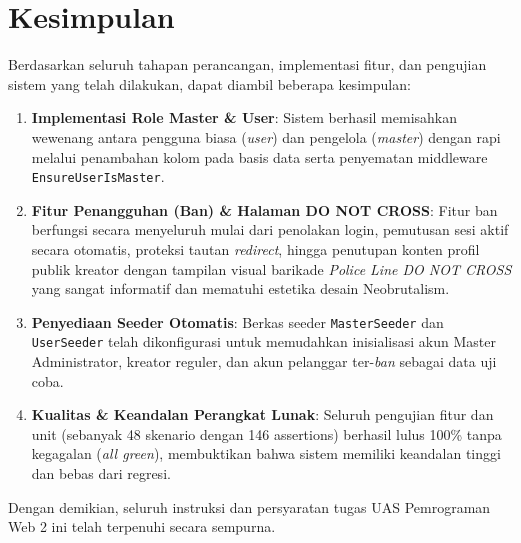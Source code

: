 \documentclass[12pt,a4paper]{article}
\begin{document}
\newpage

\section{Kesimpulan}

Berdasarkan seluruh tahapan perancangan, implementasi fitur, dan pengujian sistem yang telah dilakukan, dapat diambil beberapa kesimpulan:
\begin{enumerate}
    \item \textbf{Implementasi Role Master \& User}: Sistem berhasil memisahkan wewenang antara pengguna biasa (\textit{user}) dan pengelola (\textit{master}) dengan rapi melalui penambahan kolom pada basis data serta penyematan middleware \texttt{EnsureUserIsMaster}.
    \item \textbf{Fitur Penangguhan (Ban) \& Halaman DO NOT CROSS}: Fitur ban berfungsi secara menyeluruh mulai dari penolakan login, pemutusan sesi aktif secara otomatis, proteksi tautan \textit{redirect}, hingga penutupan konten profil publik kreator dengan tampilan visual barikade \textit{Police Line DO NOT CROSS} yang sangat informatif dan mematuhi estetika desain Neobrutalism.
    \item \textbf{Penyediaan Seeder Otomatis}: Berkas seeder \texttt{MasterSeeder} dan \texttt{UserSeeder} telah dikonfigurasi untuk memudahkan inisialisasi akun Master Administrator, kreator reguler, dan akun pelanggar ter-\textit{ban} sebagai data uji coba.
    \item \textbf{Kualitas \& Keandalan Perangkat Lunak}: Seluruh pengujian fitur dan unit (sebanyak 48 skenario dengan 146 assertions) berhasil lulus 100\% tanpa kegagalan (\textit{all green}), membuktikan bahwa sistem memiliki keandalan tinggi dan bebas dari regresi.
\end{enumerate}

Dengan demikian, seluruh instruksi dan persyaratan tugas UAS Pemrograman Web 2 ini telah terpenuhi secara sempurna.
\end{document}
